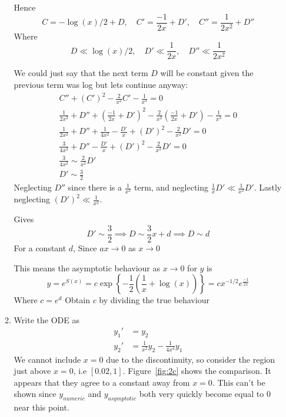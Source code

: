 \documentclass{/home/janmebows/Documents/LatexTemplates/myassignment}
\begin{document}
\begin{enumerate}
\begin{enumerate}
        Hence
            \[C = -\log(x)/2 + D,\quad C' = \frac{-1}{2x} + D',\quad C'' = \frac{1}{2x^2} + D''\]
            Where 
            \[D \ll \log(x)/2, \quad D' \ll \frac{1}{2x}, \quad D'' \ll \frac{1}{2x^2}\]

        We could just say that the next term $D$ will be constant given the previous term was log but lets continue anyway:
        \begin{align*}
             C'' + (C')^2 - \frac{2}{x^2} C'-\frac{1}{x^3} =0\\
             \frac{1}{2x^2} + D'' + (\frac{-1}{2x} + D')^2 - \frac{2}{x^2} \left(\frac{-1}{2x} + D'\right) - \frac1{x^3} =0\\
             \frac{1}{2x^2} + D'' + \frac{1}{4x^2} -\frac{D'}{x}+ (D')^2 - \frac{2}{x^2}D'=0\\
             \frac{3}{4x^2} + D'' - \frac{D'}x + (D')^2 - \frac{2}{x^2} D'  =0\\
             \frac{3}{4x^2} \sim \frac{2}{x^2} D'\\
             D' \sim \frac{3}{2}
        \end{align*}
        Neglecting $D''$ since there is a $\frac{1}{x^2}$ term, and neglecting $\frac{1}{x}D ' \ll \frac{1}{x^2} D'$. Lastly neglecting $(D')^2 \ll \frac{1}{x^2}$.

        Gives 
        \[D' \sim \frac32 \implies D \sim \frac32 x + d \implies D \sim d\]
        For a constant $d$, Since $ax \to 0$ as $x\to 0$


        This means the asymptotic behaviour as $x\to 0$ for $y$ is
        \[y = e^{S(x)} = c\exp\left\{-\frac12\left(\frac1{x} +\log(x)\right)\right\} = cx^{-1/2} e^{\frac{-1}{2x}} \]
        Where $c = e^{d}$
        Obtain $c$ by dividing the true behaviour 
        \item Write the ODE as
        \begin{align*}
            y_1' &= y_2\\
            y_2' &= \frac{1}{x^2}y_2 - \frac{1}{4x^4}y_1
        \end{align*}
        We cannot include $x=0$ due to the discontinuity, so consider the region just above $x=0$, i.e $[0.02,1]$. Figure~\ref{fig:2c} shows the comparison. It appears that they agree to a constant away from $x=0$. This can't be shown since $y_{numeric}$ and $y_{asymptotic}$ both very quickly become equal to $0$ near this point.



\end{enumerate}
\end{enumerate}
\end{document}
